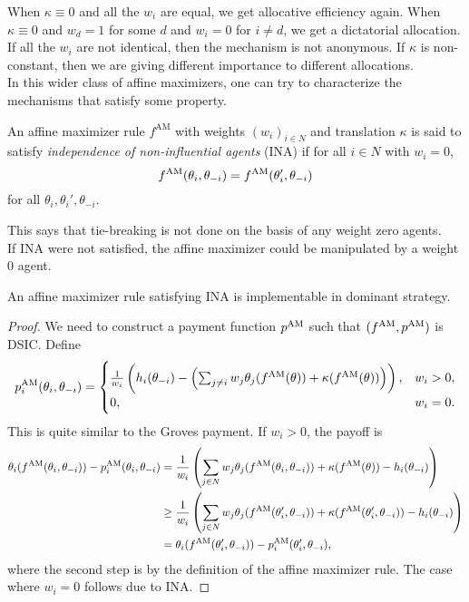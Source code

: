 		When $\kappa \equiv 0$ and all the $w_i$ are equal, we get allocative efficiency again. When $\kappa \equiv 0$ and $w_d = 1$ for some $d$ and $w_i = 0$ for $i \ne d$, we get a dictatorial allocation.\\
		If all the $w_i$ are not identical, then the mechanism is not anonymous. If $\kappa$ is non-constant, then we are giving different importance to different allocations.\\
		In this wider class of affine maximizers, one can try to characterize the mechanisms that satisfy some property.

		\begin{fdef}
			An affine maximizer rule $f^\text{AM}$ with weights $(w_i)_{i \in N}$ and translation $\kappa$ is said to satisfy \emph{independence of non-influential agents} (INA) if for all $i \in N$ with $w_i = 0$,
			\[ f^{\text{AM}}(\theta_i,\theta_{-i}) = f^{\text{AM}}(\theta_i',\theta_{-i}) \]
			for all $\theta_i,\theta_i',\theta_{-i}$. 
		\end{fdef}
		This says that tie-breaking is not done on the basis of any weight zero agents.\\
		If INA were not satisfied, the affine maximizer could be manipulated by a weight $0$ agent.

		\begin{ftheo}
			An affine maximizer rule satisfying INA is implementable in dominant strategy.
		\end{ftheo}
		\begin{proof}
			We need to construct a payment function $p^{\text{AM}}$ such that $(f^{\text{AM}},p^{\text{AM}})$ is DSIC. Define
			\[ p_i^{\text{AM}}(\theta_i,\theta_{-i}) = \begin{cases} \frac{1}{w_i} \left( h_i(\theta_{-i}) - \left( \sum_{j \ne i} w_j \theta_j(f^{\text{AM}}(\theta)) + \kappa(f^{\text{AM}}(\theta)) \right) \right), & w_i > 0, \\ 0, & w_i = 0. \end{cases} \]
			This is quite similar to the Groves payment.
			If $w_i > 0$, the payoff is
			\begin{align*}
				\theta_i(f^{\text{AM}}(\theta_i,\theta_{-i})) - p_i^{\text{AM}}(\theta_i,\theta_{-i}) &= \frac{1}{w_i} \left( \sum_{j \in N} w_j \theta_j(f^{\text{AM}}(\theta_i,\theta_{-i})) + \kappa(f^{\text{AM}}(\theta)) - h_i(\theta_{-i}) \right) \\
					&\ge \frac{1}{w_i} \left( \sum_{j \in N} w_j \theta_j(f^{\text{AM}}(\theta_i',\theta_{-i})) + \kappa(f^{\text{AM}}(\theta_i',\theta_{-i})) - h_i(\theta_{-i}) \right) \\
					&= \theta_i(f^{\text{AM}}(\theta_i',\theta_{-i})) - p_i^{\text{AM}}(\theta_i',\theta_{-i}),
			\end{align*}
			where the second step is by the definition of the affine maximizer rule. The case where $w_i = 0$ follows due to INA.
		\end{proof}

